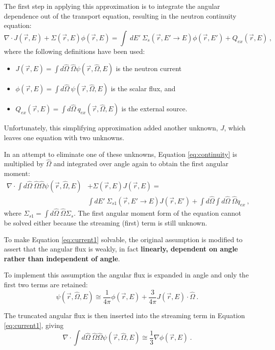 \documentclass[12pt]{article}
\newcommand{\Macro}{\ensuremath{\Sigma}}
\newcommand{\vOmega}{\ensuremath{\hat{\Omega}}}
\begin{document}
The first step in applying this approximation is to integrate the angular
dependence out of the transport equation, resulting in the neutron continuity equation:
%
\begin{equation}
  \nabla \cdot J(\vec{r},E) + \Macro(\vec{r},E)\phi(\vec{r},E) = \int \:dE' \:\Macro_{s}(\vec{r}, E' \to E)\phi(\vec{r},E') + Q_{ex}(\vec{r},E) \:,
  \label{eq:continuity} 
\end{equation}
%
where the following definitions have been used:
%
\begin{itemize}
\item $J(\vec{r},E) = \int d\vOmega \:\vOmega \psi(\vec{r}, \vOmega, E)$ is the neutron current \\
\item  $\phi(\vec{r},E) = \int d\vOmega \:\psi(\vec{r}, \vOmega, E)$ is the scalar flux, and \\
\item $Q_{ex} (\vec{r},E)= \int d\vOmega \:q_{ex}(\vec{r}, \vOmega, E)$ is the external source.
\end{itemize}

Unfortunately, this simplifying approximation added another unknown, $J$,
which leaves one equation with two unknowns. 

In an attempt to eliminate one of these unknowns, Equation
\eqref{eq:continuity} is multiplied by $\hat{\Omega}$ and integrated over angle
again to obtain the first angular moment:
%
\begin{align}
  \nabla \cdot \int  d\vOmega \:\vOmega \vOmega \psi(\vec{r}, \vOmega, E) &+ \Macro(\vec{r},E) J(\vec{r},E)= \nonumber \\
  &\int dE' \:\Macro_{s1}(\vec{r}, E' \to E)J(\vec{r},E') + \int d\vOmega \int d\vOmega \:\vOmega q_{ex} \:,
  \label{eq:current1}
\end{align}
%
where $\Macro_{s1}  = \int d\vOmega \:\vOmega \Macro_{s}$. The first angular moment form of the equation cannot be solved either because the streaming (first) term is still unknown. 

To make Equation \eqref{eq:current1} solvable, the original assumption is modified to assert that the angular flux is weakly, in fact \textbf{linearly, dependent on angle rather than independent of angle}.

To implement this assumption the angular flux is expanded in angle and only the first two terms are retained:  
%
\begin{equation}
  \psi(\vec{r}, \vOmega, E) \cong \frac{1}{4 \pi} \phi(\vec{r}, E) + \frac{3}{4 \pi}J(\vec{r}, E) \cdot \vOmega \:.
  \label{eq:angExpand} 
\end{equation}

The truncated angular flux is then inserted into the streaming term in Equation \eqref{eq:current1}, giving 
%
\begin{equation}
  \nabla \cdot \int d \vOmega \:\vOmega \vOmega \psi(\vec{r}, \vOmega, E)  \cong \frac{1}{3} \nabla \phi(\vec{r}, E) \:. 
  \label{eq:firstTerm}
\end{equation}
\end{document}
